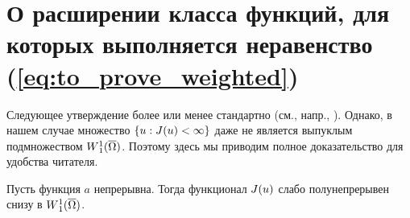 \section{О расширении класса функций, для которых выполняется неравенство (\ref{eq:to_prove_weighted})}



Следующее утверждение более или менее стандартно (см., напр., \cite[теорема 3.5]{BGH}).
Однако, в нашем случае множество $\{u: J(u) < \infty\}$ даже не является выпуклым подмножеством $\W(\overline{\Omega})$.
Поэтому здесь мы приводим полное доказательство для удобства читателя.

\begin{lm}
\label{lm:lowersemi}
Пусть функция $a$ непрерывна.
Тогда функционал $J(u)$ слабо полунепрерывен снизу в $\W(\overline{\Omega})$.
\end{lm}

